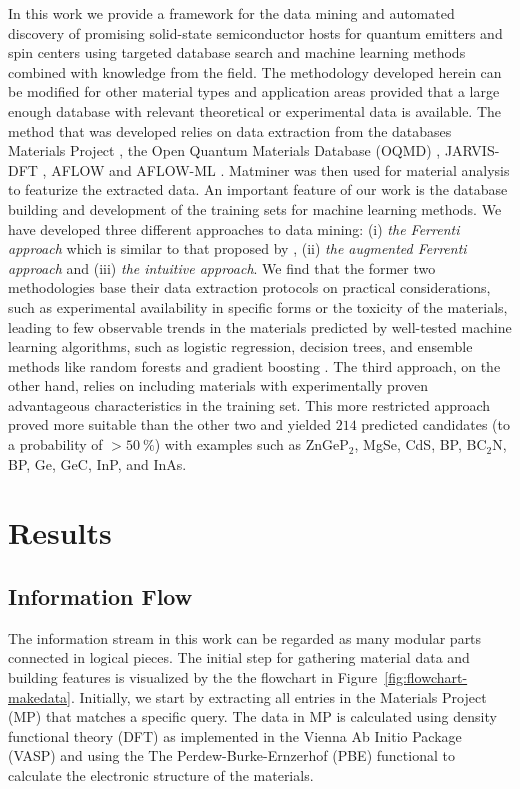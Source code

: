 \documentclass[superscriptaddress,unsortedaddress,
 amsmath,amssymb,
 aps,
]{revtex4-2}
\begin{document}
In this work we provide a framework for the data mining and automated discovery of promising solid-state semiconductor hosts for quantum emitters and spin centers using targeted database search and machine learning methods combined with knowledge from the field. The methodology developed herein can be modified for other material types and application areas provided that a large enough database with relevant theoretical or experimental data is available. 
The method that was developed relies on data extraction from the databases Materials Project \cite{Jain2013,Jain2018}, the Open Quantum Materials Database (OQMD) \cite{Saal2013, Kirklin2015}, JARVIS-DFT \cite{Choudhary2020}, AFLOW \cite{Curtarolo2012, Curtarolo2012a, Calderon2015} and AFLOW-ML \cite{Isayev2017}. 
Matminer \cite{Ward2018} was then used for material analysis to featurize the extracted data. An important feature of our work is the database building and development of the training sets for machine learning methods. We have developed three different approaches to data mining: (i) \emph{the Ferrenti approach} which is similar to that proposed by \citeauthor{Ferrenti2020}  \cite{Ferrenti2020}, (ii) \emph{the augmented Ferrenti approach} and (iii) \emph{the intuitive approach}. We find that the former two methodologies base their data extraction protocols on practical considerations, such as experimental availability in specific forms or the toxicity of the materials, leading to few observable trends in the materials predicted by well-tested machine learning algorithms, such as logistic regression, decision trees, and ensemble methods like random forests and gradient boosting \cite{Mehta2019,Hastie2009}. The third approach, on the other hand, relies on including materials with experimentally proven advantageous characteristics in the training set. This more restricted approach proved more suitable than the other two and yielded $214$ predicted candidates (to a probability of $>50 \ \%$) with examples such as ZnGeP$_2$, MgSe, CdS, BP, BC$_2$N, BP, Ge, GeC, InP, and InAs. 

\section*{Results}

\subsection*{Information Flow} 

The information stream in this work can be regarded as many modular parts connected in logical pieces. The initial step for gathering material data and building features is visualized by the the flowchart in Figure~\ref{fig:flowchart-makedata}. 
Initially, we start by extracting all entries in
the Materials Project (MP) that matches a specific query. 
The data in MP is calculated using density functional theory (DFT) as implemented in the Vienna Ab Initio Package (VASP) \cite{Kresse1996} and using the The Perdew-Burke-Ernzerhof \cite{Perdew1996} (PBE) functional to calculate the electronic structure of the materials. 
\end{document}
